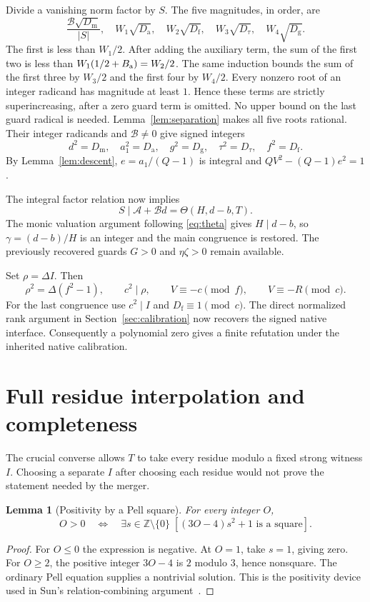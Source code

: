 \documentclass[11pt,a4paper]{article}
\newtheorem{lemma}[theorem]{Lemma}
\theoremstyle{definition}\newtheorem{definition}[theorem]{Definition}
\theoremstyle{remark}\newtheorem{remark}[theorem]{Remark}
\newcommand{\Z}{\mathbb Z}\newcommand{\Q}{\mathbb Q}\newcommand{\N}{\mathbb N}\newcommand{\R}{\mathbb R}
\newcommand{\Dm}{D_{\mathrm m}}\newcommand{\Df}{D_{\mathrm f}}
\newcommand{\Dt}{D_{\tau}}\newcommand{\Da}{D_{\mathrm a}}
\newcommand{\Dg}{D_{\mathrm g}}\newcommand{\Pair}{\operatorname{Pair}}
\numberwithin{equation}{section}
\begin{document}
Divide a vanishing norm factor by $S$. The five magnitudes, in order, are
\[
 \frac{\mathcal B\sqrt{\Dm}}{|S|},\quad
 W_1\sqrt{\Da},\quad W_2\sqrt{\Df},\quad
 W_3\sqrt{\Dt},\quad W_4\sqrt{\Dg}.
\]
The first is less than $W_1/2$. After adding the auxiliary term, the sum
of the first two is less than
$W_1(1/2+B_{\rm a})=W_2/2$.
The same induction bounds the sum of the first three by $W_3/2$
and the first four by $W_4/2$.
Every nonzero root of an integer radicand has magnitude at least $1$.
Hence these terms are strictly superincreasing, after a zero guard term
is omitted. No upper bound on the last guard radical is needed.
Lemma~\ref{lem:separation} makes all five roots rational. Their integer
radicands and $\mathcal B\ne0$ give signed integers
\[
 d^2=\Dm,\quad a_1^2=\Da,\quad g^2=\Dg,\quad
 \tau^2=\Dt,\quad f^2=\Df.
\]
By Lemma~\ref{lem:descent}, $e=a_1/(Q-1)$ is integral and
$QV^2-(Q-1)e^2=1$.

The integral factor relation now implies
\begin{equation}
 S\mid\mathcal A+\mathcal B d
      =\Theta(H,d-b,T).
 \label{eq:div12}
\end{equation}
The monic valuation argument following \eqref{eq:theta} gives $H\mid d-b$,
so $\gamma=(d-b)/H$ is an integer and the main congruence is restored.
The previously recovered guards $G>0$ and $\eta\zeta>0$ remain available.

Set $\rho=\Delta I$. Then
\[
 \rho^2=\Delta(f^2-1),\qquad c^2\mid\rho,
 \qquad V\equiv-c\pmod f,\qquad V\equiv-R\pmod c.
\]
For the last congruence use $c^2\mid I$ and
$\Df\equiv1\pmod c$. The direct normalized rank argument in Section~\ref{sec:calibration}
now recovers the signed native interface. Consequently a polynomial zero
gives a finite refutation under the inherited native calibration.

\section{Full residue interpolation and completeness}
\label{sec:interpolation}

The crucial converse allows $T$ to take every residue modulo a fixed
strong witness $I$. Choosing a separate $I$ after choosing each residue
would not prove the statement needed by the merger.

\begin{lemma}[Positivity by a Pell square]\label{lem:positivity}
For every integer $O$,
\[
 O>0\quad\Longleftrightarrow\quad
 \exists s\in\Z\setminus\{0\}\;[(3O-4)s^2+1\text{ is a square}].
\]
\end{lemma}
\begin{proof}
For $O\le0$ the expression is negative. At $O=1$, take $s=1$,
giving zero. For $O\ge2$, the positive integer $3O-4$ is $2$ modulo
$3$, hence nonsquare. The ordinary Pell equation supplies a nontrivial
solution. This is the positivity device used in Sun's relation-combining
argument~\cite{sun2026}.
\end{proof}
\end{document}
